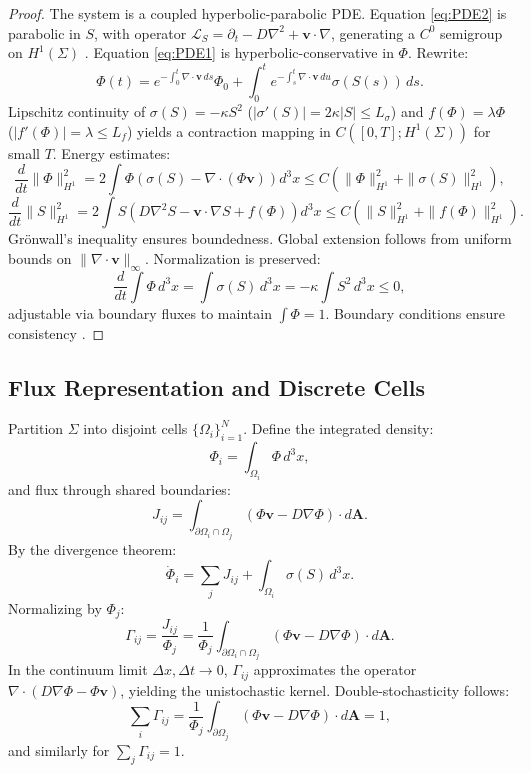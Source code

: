\documentclass[12pt]{article}
\begin{document}
\begin{proof}
The system is a coupled hyperbolic-parabolic PDE. Equation \eqref{eq:PDE2} is parabolic in \(S\), with operator \(\mathcal{L}_S = \partial_t - D \nabla^2 + \mathbf{v} \cdot \nabla\), generating a \(C^0\) semigroup on \(H^1(\Sigma)\) \cite{Risken1996}. Equation \eqref{eq:PDE1} is hyperbolic-conservative in \(\Phi\). Rewrite:
\[
\Phi(t) = e^{-\int_0^t \nabla \cdot \mathbf{v} \, ds} \Phi_0 + \int_0^t e^{-\int_s^t \nabla \cdot \mathbf{v} \, du} \sigma(S(s)) \, ds.
\]
Lipschitz continuity of \(\sigma(S) = -\kappa S^2\) (\(|\sigma'(S)| = 2 \kappa |S| \leq L_\sigma\)) and \(f(\Phi) = \lambda \Phi\) (\(|f'(\Phi)| = \lambda \leq L_f\)) yields a contraction mapping in \(C([0, T]; H^1(\Sigma))\) for small \(T\). Energy estimates:
\[
\frac{d}{dt} \|\Phi\|_{H^1}^2 = 2 \int \Phi \left( \sigma(S) - \nabla \cdot (\Phi \mathbf{v}) \right) d^3x \leq C (\|\Phi\|_{H^1}^2 + \|\sigma(S)\|_{H^1}^2),
\]
\[
\frac{d}{dt} \|S\|_{H^1}^2 = 2 \int S \left( D \nabla^2 S - \mathbf{v} \cdot \nabla S + f(\Phi) \right) d^3x \leq C (\|S\|_{H^1}^2 + \|f(\Phi)\|_{H^1}^2).
\]
Grönwall’s inequality ensures boundedness. Global extension follows from uniform bounds on \(\|\nabla \cdot \mathbf{v}\|_\infty\). Normalization is preserved:
\[
\frac{d}{dt} \int \Phi \, d^3x = \int \sigma(S) \, d^3x = -\kappa \int S^2 \, d^3x \leq 0,
\]
adjustable via boundary fluxes to maintain \(\int \Phi = 1\). Boundary conditions ensure consistency \cite{Risken1996}.
\end{proof}

\subsection{Flux Representation and Discrete Cells}

Partition \(\Sigma\) into disjoint cells \(\{\Omega_i\}_{i=1}^N\). Define the integrated density:
\[
\Phi_i = \int_{\Omega_i} \Phi \, d^3x,
\]
and flux through shared boundaries:
\[
J_{ij} = \int_{\partial \Omega_i \cap \Omega_j} (\Phi \mathbf{v} - D \nabla \Phi) \cdot d\mathbf{A}.
\]
By the divergence theorem:
\[
\dot{\Phi}_i = \sum_j J_{ij} + \int_{\Omega_i} \sigma(S) \, d^3x.
\]
Normalizing by \(\Phi_j\):
\[
\Gamma_{ij} = \frac{J_{ij}}{\Phi_j} = \frac{1}{\Phi_j} \int_{\partial \Omega_i \cap \Omega_j} (\Phi \mathbf{v} - D \nabla \Phi) \cdot d\mathbf{A}.
\]
In the continuum limit \(\Delta x, \Delta t \to 0\), \(\Gamma_{ij}\) approximates the operator \(\nabla \cdot (D \nabla \Phi - \Phi \mathbf{v})\), yielding the unistochastic kernel. Double-stochasticity follows:
\[
\sum_i \Gamma_{ij} = \frac{1}{\Phi_j} \int_{\partial \Omega_j} (\Phi \mathbf{v} - D \nabla \Phi) \cdot d\mathbf{A} = 1,
\]
and similarly for \(\sum_j \Gamma_{ij} = 1\).
\end{document}
